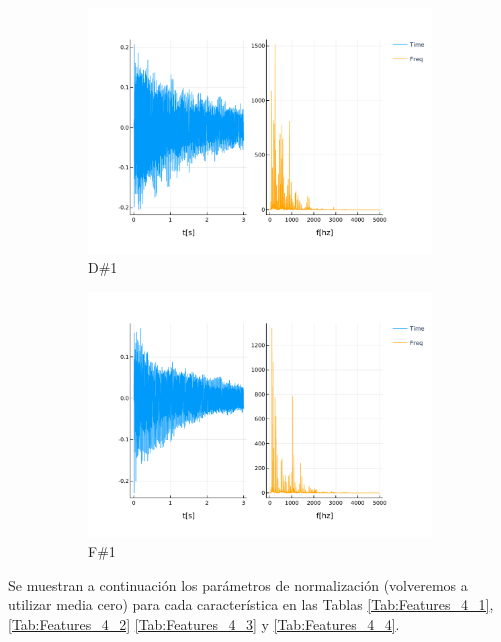 \documentclass[12pt]{article}
\begin{document}
\begin{figure}[!ht]
	\centering
	\begin{subfigure}{.5\textwidth}
		\centering
		\includegraphics[width=1.0\linewidth]{assets/D1_sos.pdf}
		\caption{D\#1}
		\label{fig:d1_sos}
	\end{subfigure}%
	\begin{subfigure}{.5\textwidth}
		\centering
		\includegraphics[width=1.0\linewidth]{assets/F1_sos.pdf}
		\caption{F\#1}
		\label{fig:f1_sos}
	\end{subfigure}
	\caption{}
\end{figure}

Se muestran a continuación los parámetros de normalización (volveremos a utilizar media cero) para cada característica en las Tablas \ref{Tab:Features_4_1},
\ref{Tab:Features_4_2} \ref{Tab:Features_4_3} y \ref{Tab:Features_4_4}.
\end{document}
